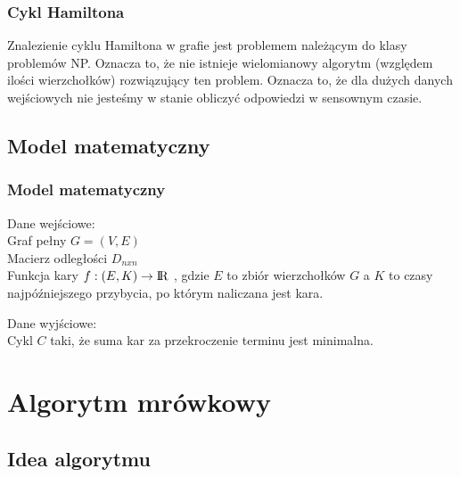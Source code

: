 \documentclass{beamer}
\begin{document}
\begin{frame}
\frametitle{Cykl Hamiltona}
Znalezienie cyklu Hamiltona w grafie jest problemem należącym do klasy problemów NP.
Oznacza to, że nie istnieje wielomianowy algorytm (względem ilości wierzchołków) rozwiązujący ten problem. Oznacza to, że dla dużych danych wejściowych nie jesteśmy w stanie obliczyć odpowiedzi w sensownym czasie.
\end{frame}

\subsection{Model matematyczny}
\begin{frame}
\frametitle{Model matematyczny}
Dane wejściowe: \\
Graf pełny $G=(V,E)$  \\
Macierz odległości $D_{nxn}$ \\
Funkcja kary $ f : (E,K) \rightarrow {\rm I\!R} $ , gdzie $E$ to zbiór wierzchołków $G$ a $K$ to czasy najpóźniejszego przybycia, po którym naliczana jest kara.

Dane wyjściowe: \\
Cykl $C$ taki, że suma kar za przekroczenie terminu jest minimalna.
\end{frame}





\section{Algorytm mrówkowy}

\subsection{Idea algorytmu}
\end{document}
